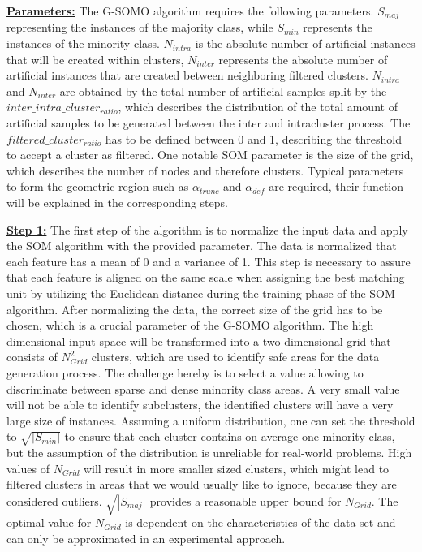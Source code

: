\documentclass[parskip=full]{scrartcl}
\begin{document}
\textbf{\underline{Parameters:}} The G-SOMO algorithm requires the following parameters. $S_{maj}$ 
representing the instances of the majority class, while $S_{min}$ represents the instances of the minority
 class. $N_{intra}$ is the absolute number of artificial instances that will be created within 
 clusters, $N_{inter}$ represents the absolute number of artificial instances that are created between 
 neighboring filtered clusters. $N_{intra}$ and $N_{inter}$ are obtained by the total number of artificial
  samples split by the $inter\_intra\_cluster_{ratio}$, which describes the distribution of the total 
  amount of artificial samples to be generated between the inter and intracluster process. The 
  $filtered\_cluster_{ratio}$ has to be defined between 0 and 1, describing the threshold to accept 
  a cluster as filtered. One notable SOM parameter is the size of the grid, which describes the 
  number of nodes and therefore clusters. Typical parameters to form the geometric region such 
  as $\alpha_{trunc}$ and $\alpha_{def}$ are required, their function will be explained in the 
  corresponding steps. 

\textbf{\underline{Step 1:}} The first step of the algorithm is to normalize the input data and apply 
the SOM algorithm with the provided parameter. The data is normalized that each feature has a mean 
of 0 and a variance of 1.  This step is necessary to assure that each feature is aligned on the same 
scale when assigning the best matching unit by utilizing the Euclidean distance during the training 
phase of the SOM algorithm. After normalizing the data, the correct size of the grid has to be chosen, 
which is a crucial parameter of the G-SOMO algorithm. The high dimensional input space will be 
transformed into a two-dimensional grid that consists of $N_{Grid}^2$ clusters, which are used to 
identify safe areas for the data generation process. The challenge hereby is to select a value 
allowing to discriminate between sparse and dense minority class areas.  A very small value will 
not be able to identify subclusters, the identified clusters will have a very large size of instances. 
Assuming a uniform distribution, one can set the threshold to  $\sqrt{|S_{min}|}$ to ensure that each 
cluster contains on average one minority class,  but the assumption of the distribution is unreliable 
for real-world problems. High values of $N_{Grid}$ will result in more smaller sized clusters, which 
might lead to filtered clusters in areas that we would usually like to ignore, because they are 
considered outliers. $\sqrt{|S_{maj}|}$ provides a reasonable upper bound for $N_{Grid}$. The optimal
 value for $N_{Grid}$ is dependent on the characteristics of the data set and can only be 
 approximated in an experimental approach.
\end{document}

